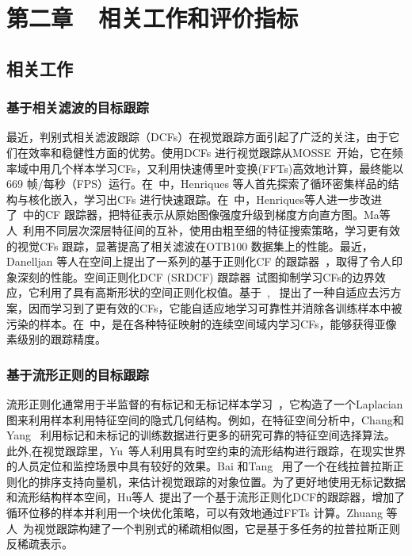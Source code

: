 ﻿\chapter{第二章~~相关工作和评价指标} %

\label{chap01}

\section{相关工作}

\subsection{基于相关滤波的目标跟踪}
最近，判别式相关滤波跟踪（DCFs）在视觉跟踪方面引起了广泛的关注，由于它们在效率和稳健性方面的优势。使用DCFs 进行视觉跟踪从MOSSE~\cite{bolme2010visual}开始，它在频率域中用几个样本学习CFs，又利用快速傅里叶变换(FFTs)高效地计算，最终能以669 帧/每秒（FPS）运行。在~\cite{henriques2012exploiting}中，Henriques 等人首先探索了循环密集样品的结构与核化嵌入，学习出CFs 进行快速跟踪。在~\cite{henriques2015high}中，Henriques等人进一步改进了~\cite{henriques2012exploiting}中的CF 跟踪器，把特征表示从原始图像强度升级到梯度方向直方图。Ma等人~\cite{ma2015hierarchical}利用不同层次深层特征间的互补，使用由粗至细的特征搜索策略，学习更有效的视觉CFs 跟踪，显著提高了相关滤波在OTB100 数据集上的性能。最近，Danelljan 等人在空间上提出了一系列的基于正则化CF 的跟踪器~\cite{danelljan2015learning,danelljan2016adaptive,danelljan2016beyond}，取得了令人印象深刻的性能。空间正则化DCF (SRDCF) 跟踪器~\cite{danelljan2015learning}试图抑制学习CFs的边界效应，它利用了具有高斯形状的空间正则化权值。基于~\cite{danelljan2015learning}, ~\cite{danelljan2016adaptive}提出了一种自适应去污方案，因而学习到了更有效的CFs，它能自适应地学习可靠性并消除各训练样本中被污染的样本。在~\cite{danelljan2016beyond}中，是在各种特征映射的连续空间域内学习CFs，能够获得亚像素级别的跟踪精度。

\subsection{基于流形正则的目标跟踪}

流形正则化通常用于半监督的有标记和无标记样本学习~\cite{belkin2006manifold, chang2017semisupervised, yu2013harry}，它构造了一个Laplacian 图来利用样本利用特征空间的隐式几何结构。例如，在特征空间分析中，Chang和Yang ~\cite{chang2017semisupervised}利用标记和未标记的训练数据进行更多的研究可靠的特征空间选择算法。此外,在视觉跟踪里，Yu~\cite{yu2013harry}等人利用具有时空约束的流形结构进行跟踪，在现实世界的人员定位和监控场景中具有较好的效果。Bai 和Tang~\cite{bai2012robust} 用了一个在线拉普拉斯正则化的排序支持向量机，来估计视觉跟踪的对象位置。为了更好地使用无标记数据和流形结构样本空间，Hu等人~\cite{hu2017manifold}提出了一个基于流形正则化DCF的跟踪器，增加了循环位移的样本并利用一个块优化策略，可以有效地通过FFTs 计算。Zhuang 等人~\cite{zhuang2014visual}为视觉跟踪构建了一个判别式的稀疏相似图，它是基于多任务的拉普拉斯正则反稀疏表示。

